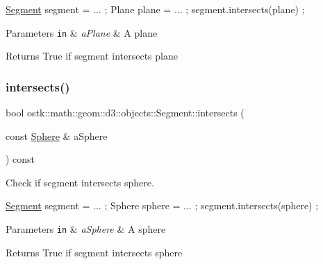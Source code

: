 \begin{DoxyCode}
\hyperlink{classostk_1_1math_1_1geom_1_1d3_1_1objects_1_1_segment_aa2cb60ce06335a5f76120c658219494c}{Segment} segment = ... ;
Plane plane = ... ;
segment.intersects(plane) ;
\end{DoxyCode}



\begin{DoxyParams}[1]{Parameters}
\mbox{\tt in}  & {\em a\+Plane} & A plane \\
\hline
\end{DoxyParams}
\begin{DoxyReturn}{Returns}
True if segment intersects plane 
\end{DoxyReturn}
\mbox{\label{classostk_1_1math_1_1geom_1_1d3_1_1objects_1_1_segment_a89ca3e575e43516435d8b3f6f5a6c624}} 
\subsubsection{\texorpdfstring{intersects()}{intersects()}\hspace{0.1cm}{\footnotesize\ttfamily [2/3]}}
{\footnotesize\ttfamily bool ostk\+::math\+::geom\+::d3\+::objects\+::\+Segment\+::intersects (\begin{DoxyParamCaption}\item[{const \hyperlink{classostk_1_1math_1_1geom_1_1d3_1_1objects_1_1_sphere}{Sphere} \&}]{a\+Sphere }\end{DoxyParamCaption}) const}



Check if segment intersects sphere. 


\begin{DoxyCode}
\hyperlink{classostk_1_1math_1_1geom_1_1d3_1_1objects_1_1_segment_aa2cb60ce06335a5f76120c658219494c}{Segment} segment = ... ;
Sphere sphere = ... ;
segment.intersects(sphere) ;
\end{DoxyCode}



\begin{DoxyParams}[1]{Parameters}
\mbox{\tt in}  & {\em a\+Sphere} & A sphere \\
\hline
\end{DoxyParams}
\begin{DoxyReturn}{Returns}
True if segment intersects sphere 
\end{DoxyReturn}
\mbox{\label{classostk_1_1math_1_1geom_1_1d3_1_1objects_1_1_segment_a281320eb45dcfce43caab69fb4051242}} 
